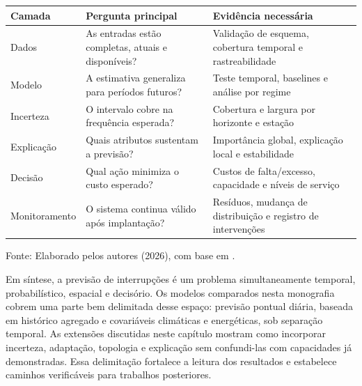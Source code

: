 \begin{quadro}[H]
\caption{Camadas de uma utilização responsável das previsões}
\label{qua:camadas_decisao}
\centering
\small
\begin{tabular}{p{3.2cm} p{5.0cm} p{5.3cm}}
\toprule
\textbf{Camada} & \textbf{Pergunta principal} & \textbf{Evidência necessária} \\
\midrule
Dados & As entradas estão completas, atuais e disponíveis? & Validação de esquema, cobertura temporal e rastreabilidade \\
Modelo & A estimativa generaliza para períodos futuros? & Teste temporal, baselines e análise por regime \\
Incerteza & O intervalo cobre na frequência esperada? & Cobertura e largura por horizonte e estação \\
Explicação & Quais atributos sustentam a previsão? & Importância global, explicação local e estabilidade \\
Decisão & Qual ação minimiza o custo esperado? & Custos de falta/excesso, capacidade e níveis de serviço \\
Monitoramento & O sistema continua válido após implantação? & Resíduos, mudança de distribuição e registro de intervenções \\
\bottomrule
\end{tabular}
\normalsize
\par\smallskip
{\small Fonte: Elaborado pelos autores (2026), com base em \cite{rudin2019stop, lundberg2017unified, kabir2024datastreams}.\par}
\end{quadro}

Em síntese, a previsão de interrupções é um problema simultaneamente temporal, probabilístico, espacial e decisório. Os modelos comparados nesta monografia cobrem uma parte bem delimitada desse espaço: previsão pontual diária, baseada em histórico agregado e covariáveis climáticas e energéticas, sob separação temporal. As extensões discutidas neste capítulo mostram como incorporar incerteza, adaptação, topologia e explicação sem confundi-las com capacidades já demonstradas. Essa delimitação fortalece a leitura dos resultados e estabelece caminhos verificáveis para trabalhos posteriores.
